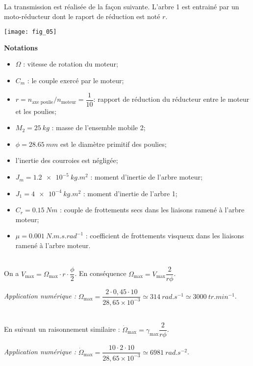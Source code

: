 \ifprof
\else
La transmission est réalisée de la façon suivante. L'arbre 1 est entrainé par un moto-réducteur dont le raport de réduction est noté $r$. 

\begin{marginfigure}
\texttt{[image: fig\_05]}
\end{marginfigure}

\noindent\textbf{Notations}
\begin{itemize}
\item $\Omega$ : vitesse de rotation du moteur;
\item $C_m$ : le couple exercé par le moteur;
\item $r=n_{\text{axe poulie}}/n_{\text{moteur}}=\dfrac{1}{10}$: rapport de réduction du réducteur entre le moteur et les poulies;
\item $M_2 = \SI{25}{kg}$ : masse de l’ensemble mobile 2;
\item $\phi = \SI{28,65}{mm}$ est le diamètre primitif des poulies;
\item l’inertie des courroies est négligée;
\item $J_m = \SI{1,2e-5}{kg.m^2}$ : moment d’inertie de l’arbre moteur;
\item $J_1 = \SI{4e-4}{kg.m^2}$ : moment d’inertie de l’arbre 1;
\item $C_r = \SI{0,15}{Nm}$ : couple de frottements secs dans les liaisons ramené à l’arbre moteur;
\item $\mu = \SI{0,001}{N.m.s.rad^{-1}}$ : coefficient de frottements visqueux dans les liaisons ramené à l’arbre moteur.
\end{itemize}
\fi

\ifprof
\begin{corrige}~\\
On a $V_{\text{max}}=\Omega_{\text{max}}\cdot r \cdot \dfrac{\phi}{2}$. En conséquence 
$\Omega_{\text{max}}=V_{\text{max}}\dfrac{2}{r \phi}$. 

\textit{Application numérique :} $\Omega_{\text{max}}=\dfrac{2\cdot 0,45 \cdot 10}{28,65\times 10^{-3}}\simeq\SI{314}{rad.s^{-1}}\simeq\SI{3000}{tr.min^{-1}}$.

\end{corrige}
\else
\fi

\ifprof
\begin{corrige}~\\
En suivant un raisonnement similaire : 
$\dot{\Omega}_{\text{max}}=\gamma_{\text{max}}\dfrac{2}{r \phi}$. 


\textit{Application numérique : } $\dot{\Omega}_{\text{max}}=\dfrac{10\cdot 2\cdot 10}{ 28,65\times 10^{-3}}\simeq \SI{6981}{rad.s^{-2}}$. 


\end{corrige}
\else
\fi


